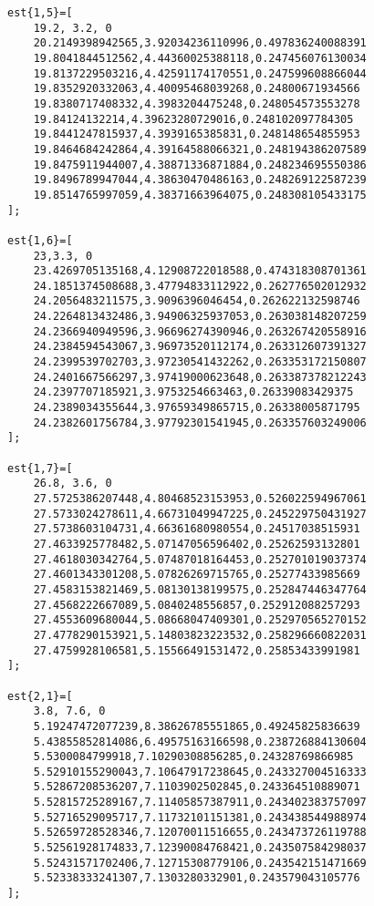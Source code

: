 \begin{verbatim}
est{1,5}=[
    19.2, 3.2, 0
    20.2149398942565,3.92034236110996,0.497836240088391
    19.8041844512562,4.44360025388118,0.247456076130034
    19.8137229503216,4.42591174170551,0.247599608866044
    19.8352920332063,4.40095468039268,0.24800671934566
    19.8380717408332,4.3983204475248,0.248054573553278
    19.84124132214,4.39623280729016,0.248102097784305
    19.8441247815937,4.3939165385831,0.248148654855953
    19.8464684242864,4.39164588066321,0.248194386207589
    19.8475911944007,4.38871336871884,0.248234695550386
    19.8496789947044,4.38630470486163,0.248269122587239
    19.8514765997059,4.38371663964075,0.248308105433175
];

est{1,6}=[
    23,3.3, 0
    23.4269705135168,4.12908722018588,0.474318308701361
    24.1851374508688,3.47794833112922,0.262776502012932
    24.2056483211575,3.9096396046454,0.262622132598746
    24.2264813432486,3.94906325937053,0.263038148207259
    24.2366940949596,3.96696274390946,0.263267420558916
    24.2384594543067,3.96973520112174,0.263312607391327
    24.2399539702703,3.97230541432262,0.263353172150807
    24.2401667566297,3.97419000623648,0.263387378212243
    24.2397707185921,3.9753254663463,0.26339083429375
    24.2389034355644,3.97659349865715,0.26338005871795
    24.2382601756784,3.97792301541945,0.263357603249006
];

est{1,7}=[
    26.8, 3.6, 0
    27.5725386207448,4.80468523153953,0.526022594967061
    27.5733024278611,4.66731049947225,0.245229750431927
    27.5738603104731,4.66361680980554,0.24517038515931
    27.4633925778482,5.07147056596402,0.25262593132801
    27.4618030342764,5.07487018164453,0.252701019037374
    27.4601343301208,5.07826269715765,0.25277433985669
    27.4583153821469,5.08130138199575,0.252847446347764
    27.4568222667089,5.0840248556857,0.252912088257293
    27.4553609680044,5.08668047409301,0.252970565270152
    27.4778290153921,5.14803823223532,0.258296660822031
    27.4759928106581,5.15566491531472,0.25853433991981
];

est{2,1}=[
    3.8, 7.6, 0
    5.19247472077239,8.38626785551865,0.49245825836639
    5.43855852814086,6.49575163166598,0.238726884130604
    5.5300084799918,7.10290308856285,0.24328769866985
    5.52910155290043,7.10647917238645,0.243327004516333
    5.52867208536207,7.1103902502845,0.243364510889071
    5.52815725289167,7.11405857387911,0.243402383757097
    5.52716529095717,7.11732101151381,0.243438544988974
    5.52659728528346,7.12070011516655,0.243473726119788
    5.52561928174833,7.12390084768421,0.243507584298037
    5.52431571702406,7.12715308779106,0.243542151471669
    5.52338333241307,7.1303280332901,0.243579043105776
];


\end{verbatim}
